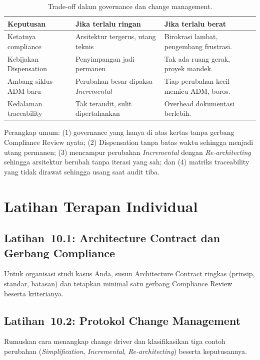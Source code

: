 \begin{table}[htbp]
\centering
\scriptsize
\caption{Trade-off dalam governance dan change management.}
\label{tab:tradeoff-bab9-gov}
\begin{tabularx}{\textwidth}{@{}p{} X X@{}}
\hline
\textbf{Keputusan} & \textbf{Jika terlalu ringan} & \textbf{Jika terlalu berat} \\
\hline
Ketatnya compliance & Arsitektur tergerus, utang teknis & Birokrasi lambat,
pengembang frustrasi. \\
Kebijakan Dispensation & Penyimpangan jadi permanen & Tak ada ruang gerak, proyek
mandek. \\
Ambang siklus ADM baru & Perubahan besar dipaksa \emph{Incremental} & Tiap
perubahan kecil memicu ADM, boros. \\
Kedalaman traceability & Tak teraudit, sulit dipertahankan & Overhead dokumentasi
berlebih. \\
\hline
\end{tabularx}
\end{table}

Perangkap umum: (1) governance yang hanya di atas kertas tanpa gerbang Compliance
Review nyata; (2) Dispensation tanpa batas waktu sehingga menjadi utang permanen;
(3) mencampur perubahan \emph{Incremental} dengan \emph{Re-architecting} sehingga
arsitektur berubah tanpa iterasi yang sah; dan (4) matriks traceability yang tidak
dirawat sehingga usang saat audit tiba.

\section{Latihan Terapan Individual}

\subsection*{Latihan~10.1: Architecture Contract dan Gerbang Compliance}
Untuk organisasi studi kasus Anda, susun Architecture Contract ringkas (prinsip,
standar, batasan) dan tetapkan minimal satu gerbang Compliance Review beserta
kriterianya.

\subsection*{Latihan~10.2: Protokol Change Management}
Rumuskan cara menangkap change driver dan klasifikasikan tiga contoh perubahan
(\emph{Simplification}, \emph{Incremental}, \emph{Re-architecting}) beserta
keputusannya.

